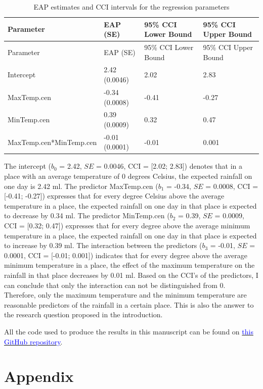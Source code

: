 \documentclass[
]{article}
\begin{document}
\begin{longtable}[]{@{}llll@{}}
\caption{EAP estimates and CCI intervals for the regression
parameters}\tabularnewline
\toprule
Parameter & EAP (SE) & 95\% CCI Lower Bound & 95\% CCI Upper Bound \\
\midrule
\endfirsthead
\toprule
Parameter & EAP (SE) & 95\% CCI Lower Bound & 95\% CCI Upper Bound \\
\midrule
\endhead
Intercept & 2.42 (0.0046) & 2.02 & 2.83 \\
MaxTemp.cen & -0.34 (0.0008) & -0.41 & -0.27 \\
MinTemp.cen & 0.39 (0.0009) & 0.32 & 0.47 \\
MaxTemp.cen*MinTemp.cen & -0.01 (0.0001) & -0.01 & 0.001 \\
\bottomrule
\end{longtable}

The intercept (\(b_0\) = 2.42, \(SE\) = 0.0046, CCI = {[}2.02; 2.83{]})
denotes that in a place with an average temperature of 0 degrees
Celsius, the expected rainfall on one day is 2.42 ml. The predictor
MaxTemp.cen (\(b_1\) = -0.34, \(SE\) = 0.0008, CCI = {[}-0.41; -0.27{]})
expresses that for every degree Celsius above the average temperature in
a place, the expected rainfall on one day in that place is expected to
decrease by 0.34 ml. The predictor MinTemp.cen (\(b_2\) = 0.39, \(SE\) =
0.0009, CCI = {[}0.32; 0.47{]}) expresses that for every degree above
the average minimum temperature in a place, the expected rainfall on one
day in that place is expected to increase by 0.39 ml. The interaction
between the predictors (\(b_3\) = -0.01, \(SE\) = 0.0001, CCI =
{[}-0.01; 0.001{]}) indicates that for every degree above the average
minimum temperature in a place, the effect of the maximum temperature on
the rainfall in that place decreases by 0.01 ml. Based on the CCI's of
the predictors, I can conclude that only the interaction can not be
distinguished from 0. Therefore, only the maximum temperature and the
minimum temperature are reasonable predictors of the rainfall in a
certain place. This is also the answer to the research question proposed
in the introduction.

All the code used to produce the results in this manuscript can be found
on
\href{https://github.com/jakkermans/WheatherDataAustralia}{\textcolor{blue}{this GitHub repository}}.

\newpage

\hypertarget{appendix}{%
\section{Appendix}\label{appendix}}
\end{document}
